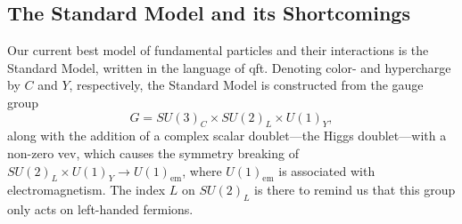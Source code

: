 \subsection{The Standard Model and its Shortcomings}\label{sec:standard_model}
Our current best model of fundamental particles and their interactions is the Standard Model, written in the language of \gls{qft}. Denoting color- and hypercharge by $C$ and $Y$, respectively, the Standard Model is constructed from the gauge group
\begin{equation}
    G=SU(3)_C \times SU(2)_L \times U(1)_Y,
    \label{eq:sm_gauge_group}
\end{equation}
along with the addition of a complex scalar doublet---the Higgs doublet---with a non-zero \gls{vev}, which causes the symmetry breaking of $SU(2)_L \times U(1)_Y \to U(1)_{\mathrm{em}}$, where $U(1)_{\mathrm{em}}$ is associated with electromagnetism.
The index $L$ on $SU(2)_L$ is there to remind us that this group only acts on left-handed fermions.

